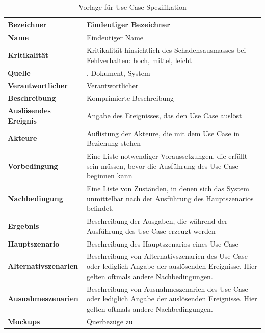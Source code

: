 \begin{table}[ht]
\centering
  \begin{tabular}{ l | p{10cm} }
	\hline
	\rowcolor{gray}
	\textbf{Bezeichner}		&	Eindeutiger Bezeichner\\ \hline
	\textbf{Name}			&	Eindeutiger Name\\ \hline
	\textbf{Kritikalität}		&	Kritikalität hinsichtlich des Schadensausmasses bei Fehlverhalten: hoch, mittel, leicht\\ \hline
	\textbf{Quelle}			&	\glossarmark{Stakeholder}, Dokument, System\\ \hline
	\textbf{Verantwortlicher}	&	Verantwortlicher \glossarmark{Stakeholder}\\ \hline
	\textbf{Beschreibung}	&	Komprimierte Beschreibung\\ \hline
	\textbf{Auslösendes Ereignis}&	Angabe des Ereignisses, das den Use Case auslöst\\ \hline
	\textbf{Akteure}		&	Auflistung der Akteure, die mit dem Use Case in Beziehung stehen\\ \hline
	\textbf{Vorbedingung}	&	Eine Liste notwendiger Voraussetzungen, die erfüllt sein müssen, bevor die Ausführung des Use Case beginnen kann\\ \hline
	\textbf{Nachbedingung}	&	Eine Liste von Zuständen, in denen sich das System unmittelbar nach der Ausführung des Hauptszenarios befindet.\\ \hline
	\textbf{Ergebnis}		&	Beschreibung der Ausgaben, die während der Ausführung des Use Case erzeugt werden\\ \hline
	\textbf{Hauptszenario}	&	Beschreibung des Hauptszenarios eines Use Case\\ \hline
	\textbf{Alternativszenarien}	&	Beschreibung von Alternativszenarien des Use Case oder lediglich Angabe der auslösenden Ereignisse. 
					Hier gelten oftmals andere Nachbedingungen.\\ \hline
	\textbf{Ausnahmeszenarien}&	Beschreibung von Ausnahmeszenarien des Use Case oder lediglich Angabe der auslösenden Ereignisse. 
					Hier gelten oftmals andere Nachbedingungen.\\ \hline
	\textbf{Mockups}	 	&	Querbezüge zu \glossarmark{Mockups}
  \end{tabular}
   \caption{Vorlage für Use Case Spezifikation}\label{table:use_case_template}
\end{table}

